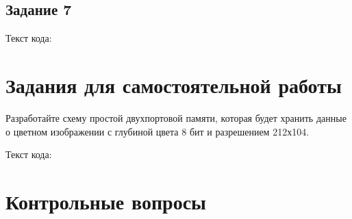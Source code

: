 \documentclass[a4paper,14pt]{article}
\begin{document}
	\subsection{Задание 7}
	
	Текст кода:
	
	
		
	\section{Задания для самостоятельной работы}
	
	Разработайте схему простой двухпортовой памяти, которая будет хранить данные о
	цветном изображении с глубиной цвета 8 бит и разрешением 212х104.
	
	Текст кода:
	
			
	\section{Контрольные вопросы}
	
\end{document}
